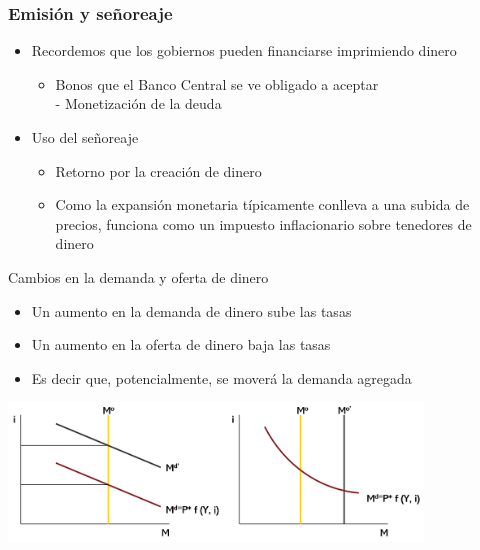 \documentclass{beamer}
\begin{document}
\begin{frame}
\frametitle{Emisión y señoreaje}
\begin{itemize}
    \item Recordemos que los gobiernos pueden financiarse imprimiendo dinero
        \begin{itemize}
        \item Bonos que el Banco Central se ve obligado a aceptar \\
        - Monetización de la deuda
        \end{itemize}
    \vspace{2mm}
    \item Uso del señoreaje
\begin{itemize}
        \item Retorno por la creación de dinero
        \item Como la expansión monetaria típicamente conlleva a una subida de precios, funciona como un impuesto inflacionario sobre tenedores de dinero 
        \end{itemize}
\end{itemize}
\end{frame}

\begin{frame}{Cambios en la demanda y oferta de dinero}
    \begin{itemize}
            \item Un aumento en la demanda de dinero sube las tasas
            \item Un aumento en la oferta de dinero baja las tasas
            \item Es decir que, potencialmente, se moverá la demanda agregada 
        \end{itemize}
    \vspace{0.3cm}
    \centering\includegraphics[width=11cm]{Figures/P62.png}\
\end{frame}
\end{document}
